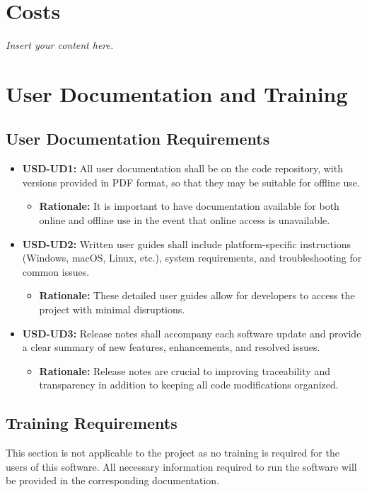 \documentclass[12pt]{article}
\newcommand{\lips}{\textit{Insert your content here.}}
\begin{document}
\section{Costs}
\lips
\section{User Documentation and Training}
\subsection{User Documentation Requirements}
\begin{itemize}
  \item \textbf{USD-UD1:} All user documentation shall be on the code repository, with versions provided in PDF format, so that they may be suitable for offline use.
  \begin{itemize}
    \item \textbf{Rationale:} It is important to have documentation available for both online and offline use in the event that online access is unavailable.
  \end{itemize}
  \item \textbf{USD-UD2:} Written user guides shall include platform-specific instructions (Windows, macOS, Linux, etc.), system requirements, and troubleshooting for common issues.
  \begin{itemize}
    \item \textbf{Rationale:} These detailed user guides allow for developers to access the project with minimal disruptions. 
  \end{itemize}
  \item \textbf{USD-UD3:} Release notes shall accompany each software update and provide a clear summary of new features, enhancements, and resolved issues.
  \begin{itemize}
    \item \textbf{Rationale:} Release notes are crucial to improving traceability and transparency in addition to keeping all code modifications organized.
  \end{itemize}
\end{itemize}

\subsection{Training Requirements}
This section is not applicable to the project as no training is required for the users of this software. All necessary information required to run the software will be provided in the corresponding documentation.
\end{document}
